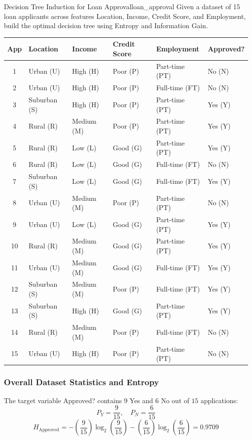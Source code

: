 \begin{example}{Decision Tree Induction for Loan Approval}{loan_approval}
Given a dataset of 15 loan applicants across features Location, Income, Credit Score, and Employment, build the optimal decision tree using Entropy and Information Gain.

\begin{center}\renewcommand{\arraystretch}{1.35}
\begin{tabular}{clllll}
\toprule
\textbf{App} & \textbf{Location} & \textbf{Income} & \textbf{Credit Score} & \textbf{Employment} & \textbf{Approved?} \\
\midrule
1  & Urban (U)    & High (H)   & Poor (P) & Part-time (PT) & No (N) \\
2  & Urban (U)    & High (H)   & Poor (P) & Full-time (FT) & No (N) \\
3  & Suburban (S) & High (H)   & Poor (P) & Part-time (PT) & Yes (Y) \\
4  & Rural (R)    & Medium (M) & Poor (P) & Part-time (PT) & Yes (Y) \\
5  & Rural (R)    & Low (L)    & Good (G) & Part-time (PT) & Yes (Y) \\
6  & Rural (R)    & Low (L)    & Good (G) & Full-time (FT) & No (N) \\
7  & Suburban (S) & Low (L)    & Good (G) & Full-time (FT) & Yes (Y) \\
8  & Urban (U)    & Medium (M) & Poor (P) & Part-time (PT) & No (N) \\
9  & Urban (U)    & Low (L)    & Good (G) & Part-time (PT) & Yes (Y) \\
10 & Rural (R)    & Medium (M) & Good (G) & Part-time (PT) & Yes (Y) \\
11 & Urban (U)    & Medium (M) & Good (G) & Full-time (FT) & Yes (Y) \\
12 & Suburban (S) & Medium (M) & Poor (P) & Full-time (FT) & Yes (Y) \\
13 & Suburban (S) & High (H)   & Good (G) & Part-time (PT) & Yes (Y) \\
14 & Rural (R)    & Medium (M) & Poor (P) & Full-time (FT) & No (N) \\
15 & Urban (U)    & High (H)   & Poor (P) & Part-time (PT) & No (N) \\
\bottomrule
\end{tabular}
\end{center}

\subsubsection{Overall Dataset Statistics and Entropy}
The target variable Approved? contains $9$ Yes and $6$ No out of $15$ applications:
\begin{equation}
P_Y = \frac{9}{15}, \quad P_N = \frac{6}{15}
\end{equation}
\begin{equation}
H_{\text{Approved}} = -\left(\frac{9}{15}\right)\log_2\left(\frac{9}{15}\right) - \left(\frac{6}{15}\right)\log_2\left(\frac{6}{15}\right) = 0.9709
\end{equation}


\end{example}
